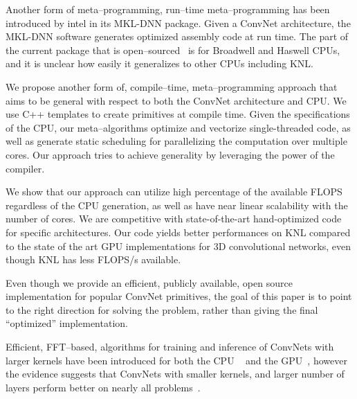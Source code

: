   Another form of meta--programming, run--time meta--programming has
  been introduced by intel in its MKL-DNN package.  Given a ConvNet
  architecture, the MKL-DNN software generates optimized assembly code
  at run time.  The part of the current package that is
  open--sourced~\cite{idlf,mkl-dnn} is for Broadwell and Haswell CPUs,
  and it is unclear how easily it generalizes to other CPUs including
  KNL.

  We propose another form of, compile--time, meta--programming
  approach that aims to be general with respect to both the ConvNet
  architecture and CPU.  We use C++ templates to create primitives at
  compile time.  Given the specifications of the CPU, our
  meta--algorithms optimize and vectorize single-threaded code, as
  well as generate static scheduling for parallelizing the computation
  over multiple cores.  Our approach tries to achieve generality by
  leveraging the power of the compiler.

  We show that our approach can utilize high percentage of the
  available FLOPS regardless of the CPU generation, as well as have
  near linear scalability with the number of cores.  We are
  competitive with state-of-the-art hand-optimized code for specific
  architectures.  Our code yields better performances on KNL
  compared to the state of the art GPU implementations for 3D
  convolutional networks, even though KNL has less FLOPS/s available.

  Even though we provide an efficient, publicly available, open source
  implementation for popular ConvNet primitives, the goal of this
  paper is to point to the right direction for solving the problem,
  rather than giving the final ``optimized'' implementation.

  Efficient, FFT--based, algorithms for training and inference of
  ConvNets with larger kernels have been introduced for both the CPU
  ~\cite{zlateski2016znn,zlateski2016znni} and the
  GPU~\cite{mathieu-iclr-14,vasilache2014fast}, however the evidence
  suggests that ConvNets with smaller kernels, and larger number of
  layers perform better on nearly all
  problems~\cite{szegedy2015going,ronneberger2015u, simonyan2014very,
    sermanet2013overfeat, long2015fully, tran2015learning, ji20133d,
    maturana_iros_2015, maturana_icra_2014}.

